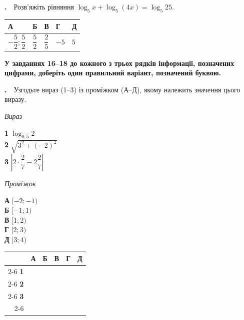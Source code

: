 \documentclass[12pt]{article}
\newcommand{\answerTableTall}[5]{%
\par\vspace{0.15cm}
\noindent
\begin{tabular}{|*{5}{>{\centering\arraybackslash}m{3cm}|}}
\hline
\rule[-0.2cm]{0pt}{0.7cm}\textbf{А} & \rule[-0.2cm]{0pt}{0.7cm}\textbf{Б} & \rule[-0.2cm]{0pt}{0.7cm}\textbf{В} & \rule[-0.2cm]{0pt}{0.7cm}\textbf{Г} & \rule[-0.2cm]{0pt}{0.7cm}\textbf{Д} \\
\hline
\rule[-0.45cm]{0pt}{1.2cm}#1 & \rule[-0.45cm]{0pt}{1.2cm}#2 & \rule[-0.45cm]{0pt}{1.2cm}#3 & \rule[-0.45cm]{0pt}{1.2cm}#4 & \rule[-0.45cm]{0pt}{1.2cm}#5 \\
\hline
\end{tabular}
\par\vspace{0.25cm}
}
\newcommand{\instructionBox}[1]{%
\par\vspace{0.3cm}
\begin{tcolorbox}[colback=instrBg, colframe=instrBorder, boxrule=0.6pt, arc=2pt,
    left=8pt, right=8pt, top=4pt, bottom=4pt]
\centering\small\bfseries #1
\end{tcolorbox}
\par\vspace{0.15cm}
}
\newcommand{\matchingGrid}{%
    \begingroup
    \renewcommand{\arraystretch}{1.15}
    \setlength{\tabcolsep}{4pt}
    \footnotesize
    \begin{tabular}{r|c|c|c|c|c|}
         \multicolumn{1}{c}{} & \multicolumn{1}{c}{\textbf{А}} & \multicolumn{1}{c}{\textbf{Б}} & \multicolumn{1}{c}{\textbf{В}} & \multicolumn{1}{c}{\textbf{Г}} & \multicolumn{1}{c}{\textbf{Д}} \\ \cline{2-6}
         \textbf{1} & \phantom{X} & \phantom{X} & \phantom{X} & \phantom{X} & \phantom{X} \\ \cline{2-6}
         \textbf{2} & & & & & \\ \cline{2-6}
         \textbf{3} & & & & & \\ \cline{2-6}
    \end{tabular}
    \endgroup
}
\newcounter{zad}
\newcommand{\zadtask}[1]{\stepcounter{zad}\noindent\textbf{\thezad.}\ \ #1\par\vspace{0.2cm}}
\begin{document}
\zadtask{Розв'яжіть рівняння $\log_5 x + \log_5(4x) = \log_5 25$.}
\answerTableTall{$-\dfrac{5}{2}; \dfrac{5}{2}$}{$\dfrac{5}{2}$}{$\dfrac{2}{5}$}{$-5$}{$5$}

\instructionBox{У завданнях 16--18 до кожного з трьох рядків інформації, позначених цифрами, доберіть один правильний варіант, позначений буквою.}

\zadtask{Узгодьте вираз (1--3) із проміжком (А--Д), якому належить значення цього виразу.
\vspace{0.3cm}
\noindent
\begin{minipage}[t]{0.45\textwidth}
\textit{Вираз}\par\vspace{0.15cm}
\textbf{1} \quad $\log_{0{,}5} 2$\\[0.25cm]
\textbf{2} \quad $\sqrt{3^2 + (-2)^2}$\\[0.25cm]
\textbf{3} \quad $\left| 2 \cdot \dfrac{2}{7} - 2\dfrac{2}{7} \right|$
\end{minipage}
\hfill
\begin{minipage}[t]{0.3\textwidth}
\textit{Проміжок}\par\vspace{0.15cm}
\textbf{А} \quad $[-2; -1)$\\[0.15cm]
\textbf{Б} \quad $[-1; 1)$\\[0.15cm]
\textbf{В} \quad $[1; 2)$\\[0.15cm]
\textbf{Г} \quad $[2; 3)$\\[0.15cm]
\textbf{Д} \quad $[3; 4)$
\end{minipage}
\hfill
\begin{minipage}[t]{0.2\textwidth}
\vspace{0.4cm}
\begin{flushright}\matchingGrid\end{flushright}
\end{minipage}}
\end{document}
